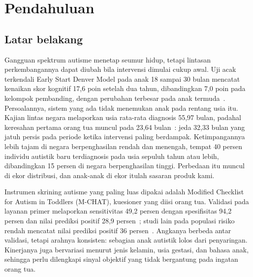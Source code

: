 \documentclass{article}
\begin{document}
\begin{abstract}
0,040997 dan agreement AOI rata-rata 99,7118 persen hasil rekomputasi dari koordinat mentah.
Blok target diketahui Gate~A menghasilkan konversi sudut lama 2,36$^\circ$ median dan
3,58$^\circ$ persentil 90 pada 94 sesi lulus, tetapi jarak pandang tidak direkam sehingga
angka itu bukan akurasi absolut eksak atau uji tanding terhadap WebGazer. Kontrol positif
dewasa menjadi bukti end-to-end utama: 12 peserta, 23 sesi direkam, 15 lulus mutu; 9/11
sesi menonton biasa dan 6/12 sesi pola diproduksi dapat dipakai, dengan aturan demonstrasi
menyala pada 0/9 dan 4/6 sesi. Hasil ini adalah manipulation check, bukan sensitivitas,
spesifisitas, ASD, atau status klinis peserta; mode demonstrasi tidak mengeluarkan rujukan.
Gate~C dan Gate~D tetap terbuka: belum ada balita, uji kader, validasi Indonesia,
wawancara praktisi, atau linkage klinis.
\end{abstract}

\section{Pendahuluan}

\subsection{Latar belakang}

Gangguan spektrum autisme menetap seumur hidup, tetapi lintasan perkembangannya dapat diubah
bila intervensi dimulai cukup awal. Uji acak terkendali Early Start Denver Model pada anak 18
sampai 30 bulan mencatat kenaikan skor kognitif 17,6 poin setelah dua tahun, dibandingkan 7,0
poin pada kelompok pembanding, dengan perubahan terbesar pada anak termuda~\cite{dawson2010}.
Persoalannya, sistem yang ada tidak menemukan anak pada rentang usia itu. Kajian lintas
negara melaporkan usia rata-rata diagnosis 55,97 bulan, padahal keresahan pertama orang tua
muncul pada 23,64 bulan~\cite{vanthof2021}: jeda 32,33 bulan yang jatuh persis pada periode
ketika intervensi paling berdampak. Ketimpangannya lebih tajam di negara berpenghasilan
rendah dan menengah, tempat 40 persen individu autistik baru terdiagnosis pada usia sepuluh
tahun atau lebih, dibandingkan 15 persen di negara berpenghasilan tinggi. Perbedaan itu
muncul di ekor distribusi, dan anak-anak di ekor itulah sasaran produk kami.

Instrumen skrining autisme yang paling luas dipakai adalah Modified Checklist for Autism in
Toddlers (M-CHAT), kuesioner yang diisi orang tua. Validasi pada layanan primer melaporkan
sensitivitas 49,2 persen dengan spesifisitas 94,2 persen dan nilai prediksi positif 28,9
persen~\cite{harper2026}; studi lain pada populasi risiko rendah mencatat nilai prediksi
positif 36 persen~\cite{sturner2016}. Angkanya berbeda antar validasi, tetapi arahnya
konsisten: sebagian anak autistik lolos dari penyaringan. Kinerjanya juga bervariasi menurut
jenis kelamin, usia gestasi, dan bahasa anak, sehingga perlu dilengkapi sinyal objektif yang
tidak bergantung pada ingatan orang tua.
\end{document}
